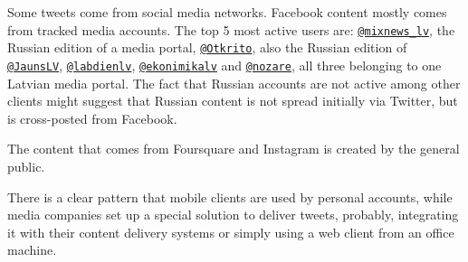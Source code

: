 \documentclass{IOS-Book-Article}
\makeatletter
\newcommand{\sn}[1]{\href{https://twitter.com/#1}{\texttt{@#1}}}
\makeatother
\begin{document}




Some tweets come from social media networks. Facebook content mostly comes from tracked media accounts. The top 5 most active users are: \sn{mixnews\_lv}, the Russian edition of a media portal, \sn{Otkrito}, also the Russian edition of \sn{JaunsLV}, \sn{labdienlv}, \sn{ekonimikalv} and \sn{nozare}, all three belonging to one Latvian media portal. The fact that Russian accounts are not active among other clients might suggest that Russian content is not spread initially via Twitter, but is cross-posted from Facebook.

The content that comes from Foursquare and Instagram is created by the general public.

There is a clear pattern that mobile clients are used by personal accounts, while media companies set up a special solution to deliver tweets, probably, integrating it with their content delivery systems or simply using a web client from an office machine.

\end{document}
